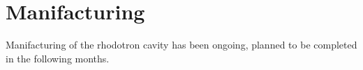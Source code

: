 \documentclass{book}
\begin{document}
\newcommand{\vecthreeBF}[1]{\vec{\textbf{#1}}}
\newcommand{\vecthree}[1]{\vec{#1}}
\newcommand{\vecNum}[3]{(#1, #2, #3)}

\newcommand{\parDeriv}[2]{\frac{\partial #1}{\partial #2}}
\newcommand{\parDerivS}[2]{\frac{\partial^2 #1}{\partial #2^2}}
\newcommand{\derivS}[2]{\frac{d^2 #1}{d#2^2}}

\newcommand{\dotProdBF}[2]{\vecthreeBF{#1} \cdot \vecthreeBF{#2}}
\newcommand{\dotProd}[2]{\vecthree{#1} \cdot \vecthree{#2}}

\newcommand{\crossProdBF}[2]{\vecthreeBF{#1} \times \vecthreeBF{#2}}
\newcommand{\crossProd}[2]{\vecthree{#1} \times \vecthree{#2}}

\newcommand{\e}{$\textbf{e}^-$ }
\newcommand{\egun}{$\textbf{e}^-$-gun }
\newcommand{\eB}{$\textbf{e}^-$ - $\vecthreeBF{B}$ }
\newcommand{\eE}{$\textbf{e}^-$ - $\vecthreeBF{E}$ }
\newcommand{\eEM}{$\textbf{e}^-$ - \textbf{EM} }
\newcommand{\ee}{$\textbf{e}^-$ - $\textbf{e}^-$ }


\newcommand{\fromeq}[1]{\textit{equation \ref{eq:#1}}}
\newcommand{\fromeqs}[2]{\textit{equations \ref{eq:#1} and \ref{eq:#2}}}
\newcommand{\fromeqsth}[3]{\textit{equations \ref{eq:#1}, \ref{eq:#2} and \ref{eq:#3}}}
\newcommand{\fromeqsf}[4]{\textit{equations \ref{eq:#1}, \ref{eq:#2}, \ref{eq:#3} and \ref{eq:#4}}}

\newcommand{\fromfig}[1]{\textit{figure \ref{fig:#1}}}
\newcommand{\fromfigs}[2]{\textit{figures \ref{fig:#1} and \ref{fig:#2}}}
\newcommand{\fromfigf}[4]{\textit{figures \ref{fig:#1}, \ref{fig:#2}, \ref{fig:#3} and \ref{fig:#4}}}

\newcommand{\fromsec}[1]{\textit{section \ref{sec:#1}}}
\newcommand{\fromsecs}[2]{\textit{sections \ref{sec:#1} and \ref{sec:#2}}}

\newcommand{\fromapp}[1]{\textit{Appendix \ref{appendix:#1}}}

\newcommand{\fromtab}[1]{\textit{Table \ref{tab:#1}}}
\newcommand{\fromtabs}[2]{\textit{Tables \ref{tab:#1} and \ref{tab:#2}}}




\section{Manifacturing}

Manifacturing of the rhodotron cavity has been ongoing, planned to be completed in the following months.
\end{document}
